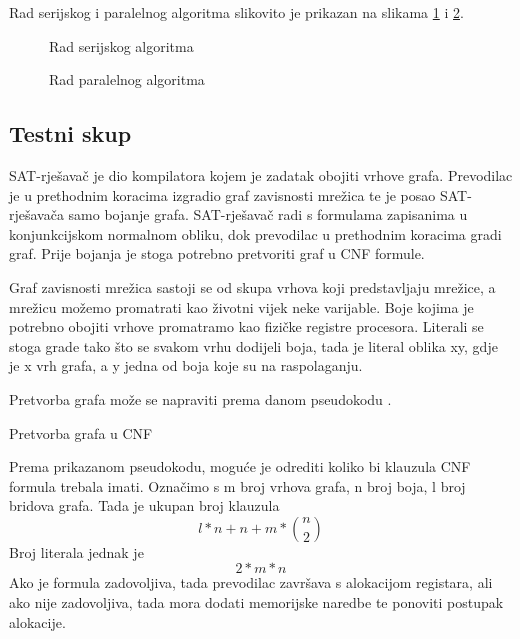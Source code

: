 \documentclass[conference]{IEEEtran}
\begin{document}
Rad serijskog i paralelnog algoritma slikovito je prikazan na slikama \ref{fig3} i \ref{fig4}.

\begin{figure}[ht]
\centerline{}
\caption{Rad serijskog algoritma}
\label{fig3}
\end{figure}

\begin{figure}[ht]
\centerline{}
\caption{Rad paralelnog algoritma}
\label{fig4}
\end{figure}

\subsection{Testni skup}
SAT-rješavač je dio kompilatora kojem je zadatak obojiti vrhove grafa. Prevodilac je u prethodnim koracima izgradio graf zavisnosti mrežica te je posao SAT-rješavača samo bojanje grafa. SAT-rješavač radi s formulama zapisanima u konjunkcijskom normalnom obliku, dok prevodilac u prethodnim koracima gradi graf. Prije bojanja je stoga potrebno pretvoriti graf u CNF formule.

Graf zavisnosti mrežica sastoji se od skupa vrhova koji predstavljaju mrežice, a mrežicu možemo promatrati kao životni vijek neke varijable. Boje kojima je potrebno obojiti vrhove promatramo kao fizičke registre procesora. Literali se stoga grade tako što se svakom vrhu dodijeli boja, tada je literal oblika xy, gdje je x vrh grafa, a y jedna od boja koje su na raspolaganju. 

Pretvorba grafa može se napraviti prema danom pseudokodu \cite{b4}.

\begin{algorithm}
\caption{Pretvorba grafa u CNF}\label{alg:two}
\end{algorithm}


Prema prikazanom pseudokodu, moguće je odrediti koliko bi klauzula CNF formula trebala imati. Označimo s m broj vrhova grafa, n broj boja, l broj bridova grafa. Tada je ukupan broj klauzula \begin{equation}
    l*n+n+m*\binom{n}{2}
\end{equation} Broj literala jednak je \begin{equation}
    2*m*n
\end{equation} Ako je formula zadovoljiva, tada prevodilac završava s alokacijom registara, ali ako nije zadovoljiva, tada mora dodati memorijske naredbe te ponoviti postupak alokacije.
\end{document}
